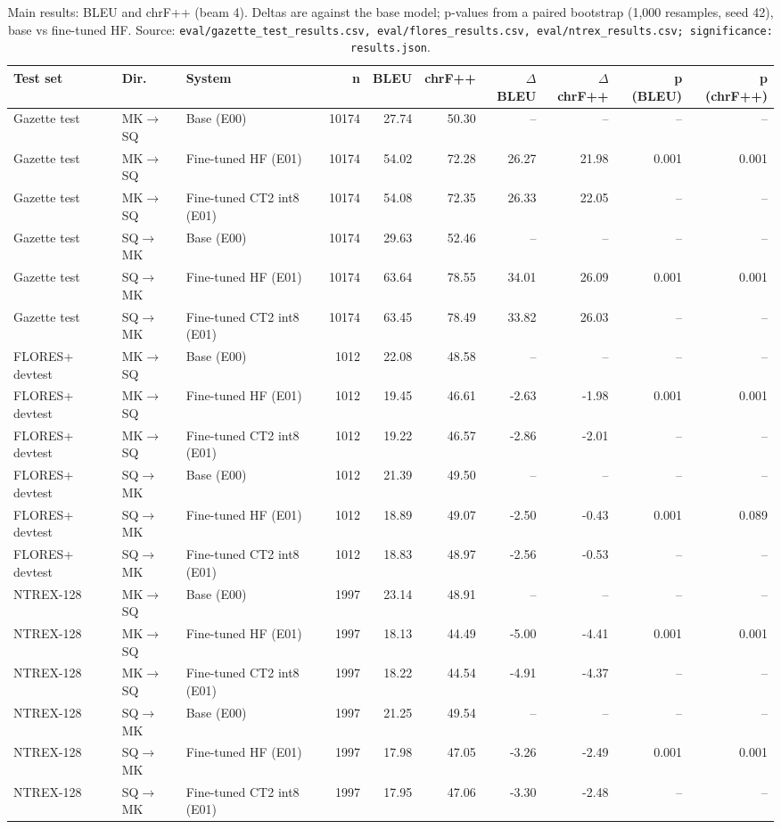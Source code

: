 \begin{table}[t]
\centering
\small
\begin{tabular}{lllrrrrrrr}
\toprule
Test set & Dir. & System & n & BLEU & chrF++ & $\Delta$BLEU & $\Delta$chrF++ & p (BLEU) & p (chrF++) \\
\midrule
Gazette test & MK$\rightarrow$SQ & Base (E00) & 10174 & 27.74 & 50.30 & -- & -- & -- & -- \\
Gazette test & MK$\rightarrow$SQ & Fine-tuned HF (E01) & 10174 & 54.02 & 72.28 & 26.27 & 21.98 & 0.001 & 0.001 \\
Gazette test & MK$\rightarrow$SQ & Fine-tuned CT2 int8 (E01) & 10174 & 54.08 & 72.35 & 26.33 & 22.05 & -- & -- \\
Gazette test & SQ$\rightarrow$MK & Base (E00) & 10174 & 29.63 & 52.46 & -- & -- & -- & -- \\
Gazette test & SQ$\rightarrow$MK & Fine-tuned HF (E01) & 10174 & 63.64 & 78.55 & 34.01 & 26.09 & 0.001 & 0.001 \\
Gazette test & SQ$\rightarrow$MK & Fine-tuned CT2 int8 (E01) & 10174 & 63.45 & 78.49 & 33.82 & 26.03 & -- & -- \\
FLORES+ devtest & MK$\rightarrow$SQ & Base (E00) & 1012 & 22.08 & 48.58 & -- & -- & -- & -- \\
FLORES+ devtest & MK$\rightarrow$SQ & Fine-tuned HF (E01) & 1012 & 19.45 & 46.61 & -2.63 & -1.98 & 0.001 & 0.001 \\
FLORES+ devtest & MK$\rightarrow$SQ & Fine-tuned CT2 int8 (E01) & 1012 & 19.22 & 46.57 & -2.86 & -2.01 & -- & -- \\
FLORES+ devtest & SQ$\rightarrow$MK & Base (E00) & 1012 & 21.39 & 49.50 & -- & -- & -- & -- \\
FLORES+ devtest & SQ$\rightarrow$MK & Fine-tuned HF (E01) & 1012 & 18.89 & 49.07 & -2.50 & -0.43 & 0.001 & 0.089 \\
FLORES+ devtest & SQ$\rightarrow$MK & Fine-tuned CT2 int8 (E01) & 1012 & 18.83 & 48.97 & -2.56 & -0.53 & -- & -- \\
NTREX-128 & MK$\rightarrow$SQ & Base (E00) & 1997 & 23.14 & 48.91 & -- & -- & -- & -- \\
NTREX-128 & MK$\rightarrow$SQ & Fine-tuned HF (E01) & 1997 & 18.13 & 44.49 & -5.00 & -4.41 & 0.001 & 0.001 \\
NTREX-128 & MK$\rightarrow$SQ & Fine-tuned CT2 int8 (E01) & 1997 & 18.22 & 44.54 & -4.91 & -4.37 & -- & -- \\
NTREX-128 & SQ$\rightarrow$MK & Base (E00) & 1997 & 21.25 & 49.54 & -- & -- & -- & -- \\
NTREX-128 & SQ$\rightarrow$MK & Fine-tuned HF (E01) & 1997 & 17.98 & 47.05 & -3.26 & -2.49 & 0.001 & 0.001 \\
NTREX-128 & SQ$\rightarrow$MK & Fine-tuned CT2 int8 (E01) & 1997 & 17.95 & 47.06 & -3.30 & -2.48 & -- & -- \\
\bottomrule
\end{tabular}
\caption{Main results: BLEU and chrF++ (beam 4). Deltas are against the base model; p-values from a paired bootstrap (1,000 resamples, seed 42), base vs fine-tuned HF. Source: \texttt{eval/gazette\_test\_results.csv, eval/flores\_results.csv, eval/ntrex\_results.csv; significance: results.json}.}
\label{tab:e01-main_results}
\end{table}
